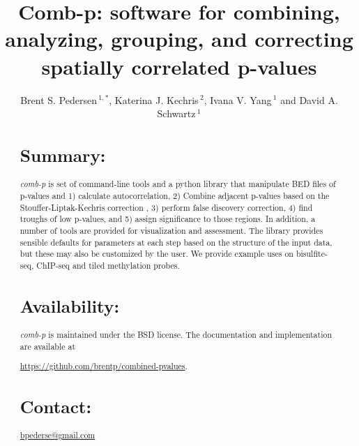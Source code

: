 \documentclass{bioinfo}
\begin{document}

\title[comb-p]{Comb-p: software for combining, analyzing, grouping, and correcting spatially correlated p-values}
\author[Pedersen \textit{et~al}]{Brent S. Pedersen\,$^{1,*}$, Katerina J. Kechris\,$^{2}$,
    Ivana V. Yang\,$^{1}$ and David A. Schwartz\,$^1$}
\address{$^{1}$Department of Medicine, University of Colorado, Denver, Anschutz Medical Campus, Aurora CO 80045, USA\\
$^{2}$Department of Statistics, University of Colorado, Denver, Anschutz Medical Campus, Aurora CO 80045, USA\\
}
\maketitle
\begin{abstract}

\section{Summary:}
\textit{comb-p} is set of command-line tools and a python library that
manipulate BED files of p-values and 1) calculate autocorrelation, 2) Combine
adjacent p-values based on the Stouffer-Liptak-Kechris correction \citep{Kechris2010},
3) perform false discovery correction, 4) find troughs of low p-values, and 5)
assign significance to those regions.
In addition, a number of tools are provided for visualization and
assessment. The library provides sensible defaults for parameters at each
step based on the structure of the input data, but these may also be customized
by the user. We provide example uses on bisulfite-seq, ChIP-seq and tiled methylation
probes.

\section{Availability:}
\textit{comb-p} is maintained under the BSD license. The documentation and
implementation are available at

\href{https://github.com/brentp/combined-pvalues}{https://github.com/brentp/combined-pvalues}.
\section{Contact:} \href{bpederse@gmail.com}{bpederse@gmail.com}
\end{abstract}
\end{document}
